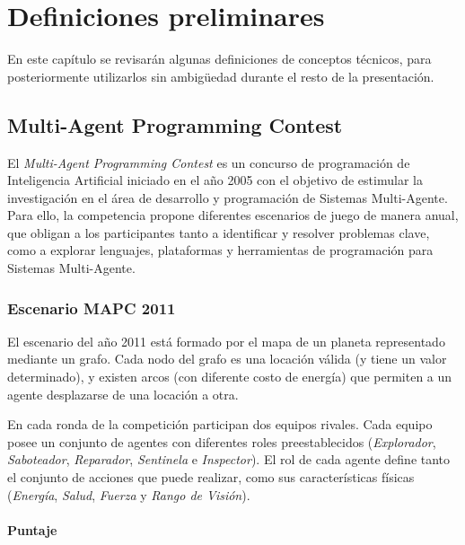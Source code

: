 
\chapter{Definiciones preliminares} 
\label{chap:definiciones_preliminares}


 En este capítulo se revisarán algunas definiciones de conceptos
 técnicos, para posteriormente utilizarlos sin ambigüedad durante el
 resto de la presentación.

\section{Multi-Agent Programming Contest}
\label{sec:mapc}

 El \textit{Multi-Agent Programming Contest} es un concurso de
 programación de Inteligencia Artificial iniciado en el año 2005 con el
 objetivo de estimular la investigación en el área de desarrollo y
 programación de Sistemas Multi-Agente.
 Para ello, la competencia propone diferentes escenarios de juego de
 manera anual, que obligan a los participantes tanto a identificar y
 resolver problemas clave, como a explorar lenguajes, plataformas y
 herramientas de programación para Sistemas Multi-Agente.

\subsection{Escenario MAPC 2011}
\label{sub:escenario_mapc}

 El escenario del año 2011 está formado por el mapa de un planeta
 representado mediante un grafo.
 Cada nodo del grafo es una locación válida (y tiene un valor
 determinado), y existen arcos (con diferente costo de energía) que
 permiten a un agente desplazarse de una locación a otra.
 
 En cada ronda de la competición participan dos equipos rivales.
 Cada equipo posee un conjunto de agentes con diferentes roles
 preestablecidos (\textit{Explorador}, \textit{Saboteador},
 \textit{Reparador}, \textit{Sentinela} e \textit{Inspector}).
 El rol de cada agente define tanto el conjunto de acciones que puede
 realizar, como sus características físicas (\textit{Energía},
 \textit{Salud}, \textit{Fuerza} y \textit{Rango de Visión}).

\subsubsection{Puntaje}
\label{subsub:puntaje}

